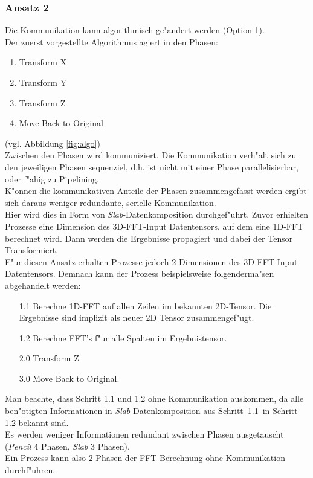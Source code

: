 \subsubsection{Ansatz 2}
Die Kommunikation kann algorithmisch ge"andert werden (Option 1).\\
Der zuerst vorgestellte Algorithmus agiert in den Phasen:
\begin{enumerate}
	\item Transform X
	\item Transform Y
	\item Transform Z
	\item Move Back to Original
\end{enumerate}
(vgl. Abbildung \ref{fig:algo})\\
Zwischen den Phasen wird kommuniziert. Die Kommunikation verh"alt sich zu den jeweiligen Phasen sequenziel, d.h. ist nicht mit einer Phase parallelisierbar, oder f"ahig zu Pipelining.\\
K"onnen die kommunikativen Anteile der Phasen zusammengefasst werden ergibt sich daraus weniger redundante, serielle Kommunikation.\\
Hier wird dies in Form von \textit{Slab}-Datenkomposition durchgef"uhrt.
Zuvor erhielten Prozesse eine Dimension des 3D-FFT-Input Datentensors, auf dem eine 1D-FFT berechnet wird. Dann werden die Ergebnisse propagiert und dabei der Tensor Transformiert.\\
F"ur diesen Ansatz erhalten Prozesse jedoch 2 Dimensionen des 3D-FFT-Input Datentensors. Demnach kann der Prozess beispielsweise folgenderma"sen abgehandelt werden:
\begin{itemize}
	\item[1.1] Berechne 1D-FFT auf allen Zeilen im bekannten 2D-Tensor. Die Ergebnisse sind implizit als neuer 2D Tensor zusammengef"ugt.
	\item[1.2] Berechne FFT's f"ur alle Spalten im Ergebnistensor.
	\item[2.0] Transform Z
	\item[3.0] Move Back to Original.
\end{itemize}
Man beachte, dass Schritt 1.1 und 1.2 ohne Kommunikation auskommen, da alle ben"otigten Informationen in \textit{Slab}-Datenkomposition aus Schritt~1.1~in Schritt 1.2 bekannt sind.\\
Es werden weniger Informationen redundant zwischen Phasen ausgetauscht (\textit{Pencil} 4 Phasen, \textit{Slab} 3 Phasen).\\
Ein Prozess kann also 2 Phasen der FFT Berechnung ohne Kommunikation durchf"uhren.\\

